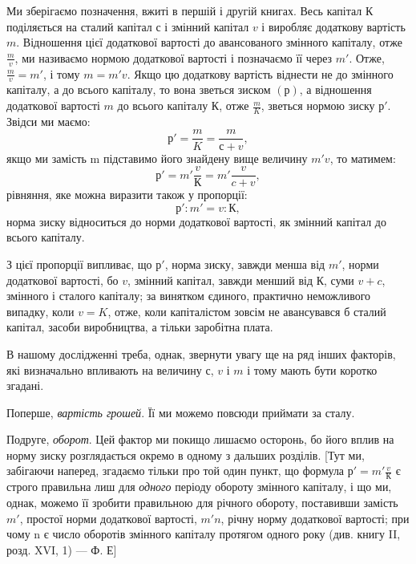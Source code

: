 Ми зберігаємо позначення, вжиті в першій і другій книгах.
Весь капітал $К$ поділяється на сталий капітал $с$ і змінний капітал
$v$ і виробляє додаткову вартість $m$. Відношення цієї додаткової
вартості до авансованого змінного капіталу, отже $\frac{m}{v}$, ми
називаємо нормою додаткової вартості і позначаємо її через $m'$.
Отже, $\frac{m}{v} = m'$, і тому $m = m'v$. Якщо цю додаткову вартість
віднести не до змінного капіталу, а до всього капіталу, то вона
зветься зиском $(р)$, а відношення додаткової вартості $m$ до
всього капіталу $К$, отже $\frac{m}{K}$, зветься нормою зиску $р'$. Звідси ми
маємо:\[
р' = \frac{m}{K} = \frac{m}{с + v},
\]
якщо ми замість m підставимо його знайдену вище величину
$m'v$, то матимем:\[
р' = m'\frac{v}{К} = m'\frac{v}{c + v},
\]
рівняння, яке можна виразити також у пропорції:\[
р':m' = v:К,
\]
норма зиску відноситься до норми додаткової вартості, як змінний
капітал до всього капіталу.

З цієї пропорції випливає, що $р'$, норма зиску, завжди менша
від $m'$, норми додаткової вартості, бо $v$, змінний капітал, завжди
менший від $К$, суми $v + c$, змінного і сталого капіталу; за винятком
єдиного, практично неможливого випадку, коли $v = K$, отже,
коли капіталістом зовсім не авансувався б сталий капітал, засоби
виробництва, а тільки заробітна плата.

В нашому дослідженні треба, однак, звернути увагу ще на
ряд інших факторів, які визначально впливають на величину $с$,
$v$ і $m$ і тому мають бути коротко згадані.

Поперше, \emph{вартість грошей}. Її ми можемо повсюди приймати
за сталу.

Подруге, \emph{оборот}. Цей фактор ми покищо лишаємо осторонь,
бо його вплив на норму зиску розглядається окремо в одному
з дальших розділів. [Тут ми, забігаючи наперед, згадаємо тільки
про той один пункт, що формула $р' = m'\frac{v}{К}$ є строго правильна
лиш для \emph{одного} періоду обороту змінного капіталу, і що ми,
однак, можемо її зробити правильною для річного обороту, поставивши
замість $m'$, простої норми додаткової вартості, $m'n$,
річну норму додаткової вартості; при чому n є число оборотів
змінного капіталу протягом одного року (див. книгу II, розд.
XVI, 1) — Ф. Е]
